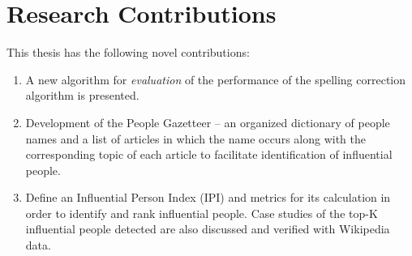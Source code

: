 \section{Research Contributions}
\label{intro:rc}
This thesis has the following novel contributions:
\begin{enumerate}
\item A new algorithm for \emph{evaluation} of the performance of the spelling correction algorithm is presented. 
\item Development of the People Gazetteer -- an organized dictionary of people names and a list of articles in which the name occurs along with the corresponding topic of each article to facilitate identification of influential people.
\item Define an Influential Person Index (IPI) and metrics for its calculation in order to identify and rank influential people. Case studies of the top-K influential people detected are also discussed and verified with Wikipedia data. 

\end{enumerate}


